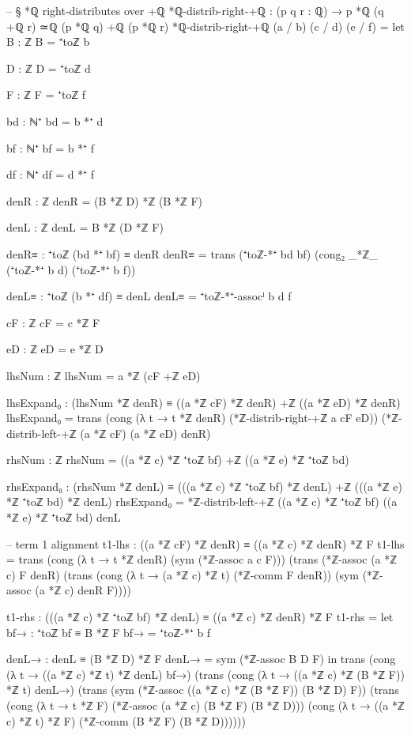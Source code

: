 \documentclass[11pt,a4paper]{book}
\begin{document}
\begin{code}
-- § *ℚ right-distributes over +ℚ
*ℚ-distrib-right-+ℚ : (p q r : ℚ) → p *ℚ (q +ℚ r) ≃ℚ (p *ℚ q) +ℚ (p *ℚ r)
*ℚ-distrib-right-+ℚ (a / b) (c / d) (e / f) =
  let
    B : ℤ
    B = ⁺toℤ b

    D : ℤ
    D = ⁺toℤ d

    F : ℤ
    F = ⁺toℤ f

    bd : ℕ⁺
    bd = b *⁺ d

    bf : ℕ⁺
    bf = b *⁺ f

    df : ℕ⁺
    df = d *⁺ f

    denR : ℤ
    denR = (B *ℤ D) *ℤ (B *ℤ F)

    denL : ℤ
    denL = B *ℤ (D *ℤ F)

    denR≡ : ⁺toℤ (bd *⁺ bf) ≡ denR
    denR≡ =
      trans
        (⁺toℤ-*⁺ bd bf)
        (cong₂ _*ℤ_ (⁺toℤ-*⁺ b d) (⁺toℤ-*⁺ b f))

    denL≡ : ⁺toℤ (b *⁺ df) ≡ denL
    denL≡ = ⁺toℤ-*⁺-assocˡ b d f

    cF : ℤ
    cF = c *ℤ F

    eD : ℤ
    eD = e *ℤ D

    lhsNum : ℤ
    lhsNum = a *ℤ (cF +ℤ eD)

    lhsExpand₀ : (lhsNum *ℤ denR) ≡ ((a *ℤ cF) *ℤ denR) +ℤ ((a *ℤ eD) *ℤ denR)
    lhsExpand₀ =
      trans
        (cong (λ t → t *ℤ denR) (*ℤ-distrib-right-+ℤ a cF eD))
        (*ℤ-distrib-left-+ℤ (a *ℤ cF) (a *ℤ eD) denR)

    rhsNum : ℤ
    rhsNum = ((a *ℤ c) *ℤ ⁺toℤ bf) +ℤ ((a *ℤ e) *ℤ ⁺toℤ bd)

    rhsExpand₀ : (rhsNum *ℤ denL) ≡ (((a *ℤ c) *ℤ ⁺toℤ bf) *ℤ denL) +ℤ (((a *ℤ e) *ℤ ⁺toℤ bd) *ℤ denL)
    rhsExpand₀ = *ℤ-distrib-left-+ℤ ((a *ℤ c) *ℤ ⁺toℤ bf) ((a *ℤ e) *ℤ ⁺toℤ bd) denL

    -- term 1 alignment
    t1-lhs : ((a *ℤ cF) *ℤ denR) ≡ ((a *ℤ c) *ℤ denR) *ℤ F
    t1-lhs =
      trans
        (cong (λ t → t *ℤ denR) (sym (*ℤ-assoc a c F)))
        (trans
          (*ℤ-assoc (a *ℤ c) F denR)
          (trans
            (cong (λ t → (a *ℤ c) *ℤ t) (*ℤ-comm F denR))
            (sym (*ℤ-assoc (a *ℤ c) denR F))))

    t1-rhs : (((a *ℤ c) *ℤ ⁺toℤ bf) *ℤ denL) ≡ ((a *ℤ c) *ℤ denR) *ℤ F
    t1-rhs =
      let
        bf→ : ⁺toℤ bf ≡ B *ℤ F
        bf→ = ⁺toℤ-*⁺ b f

        denL→ : denL ≡ (B *ℤ D) *ℤ F
        denL→ = sym (*ℤ-assoc B D F)
      in
      trans
        (cong (λ t → ((a *ℤ c) *ℤ t) *ℤ denL) bf→)
        (trans
          (cong (λ t → ((a *ℤ c) *ℤ (B *ℤ F)) *ℤ t) denL→)
          (trans
            (sym (*ℤ-assoc ((a *ℤ c) *ℤ (B *ℤ F)) (B *ℤ D) F))
            (trans
              (cong (λ t → t *ℤ F) (*ℤ-assoc (a *ℤ c) (B *ℤ F) (B *ℤ D)))
              (cong (λ t → ((a *ℤ c) *ℤ t) *ℤ F) (*ℤ-comm (B *ℤ F) (B *ℤ D))))))


\end{code}
\end{document}
